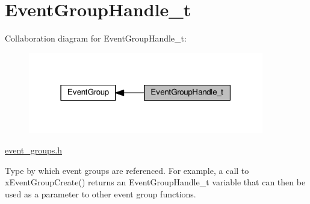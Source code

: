 \hypertarget{group___event_group_handle__t}{}\section{Event\+Group\+Handle\+\_\+t}
\label{group___event_group_handle__t}
Collaboration diagram for Event\+Group\+Handle\+\_\+t\+:\nopagebreak
\begin{figure}[H]
\begin{center}
\leavevmode
\includegraphics[width=291pt]{group___event_group_handle__t}
\end{center}
\end{figure}
\hyperlink{event__groups_8h}{event\+\_\+groups.\+h}

Type by which event groups are referenced. For example, a call to x\+Event\+Group\+Create() returns an Event\+Group\+Handle\+\_\+t variable that can then be used as a parameter to other event group functions. 